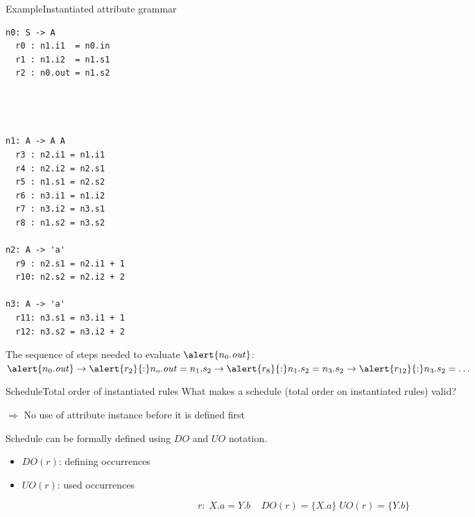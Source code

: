 \begin{frame}[fragile=singleslide]{Example}{Instantiated attribute grammar}


\begin{multicols}{3}
\begin{Verbatim}[fontsize=\scriptsize]
n0: S -> A
  r0 : n1.i1  = n0.in
  r1 : n1.i2  = n1.s1
  r2 : n0.out = n1.s2




n1: A -> A A
  r3 : n2.i1 = n1.i1
  r4 : n2.i2 = n2.s1
  r5 : n1.s1 = n2.s2
  r6 : n3.i1 = n1.i2
  r7 : n3.i2 = n3.s1
  r8 : n1.s2 = n3.s2

n2: A -> 'a'
  r9 : n2.s1 = n2.i1 + 1
  r10: n2.s2 = n2.i2 + 2
    
n3: A -> 'a'
  r11: n3.s1 = n3.i1 + 1
  r12: n3.s2 = n3.i2 + 2
\end{Verbatim}
\end{multicols}

The sequence of steps needed to evaluate $\alert{n_0.\mathit{out}}$:
$\alert{n_0.\mathit{out}} \to \alert{r_2}{:} n_o.\mathit{out} = n_1.s_2 \to \alert{r_8}{:} n_1.s_2 = n_3.s_2 \to \alert{r_{12}}{:}n_3.s_2 = \dots$

\end{frame}


\begin{frame}{Schedule}{Total order of instantiated rules}
What makes a schedule (total order on instantiated rules) valid?

\newlinevspace

$\Rightarrow$ \alert{No use of attribute instance before it is defined first}
\newlinevspace

Schedule can be formally defined using $\mathit{DO}$ and $\mathit{UO}$ notation.

\begin{itemize}
    \item \alert{$\mathit{DO}(r)$}: defining occurrences
    \item \alert{$\mathit{UO}(r)$}: used occurrences
\end{itemize}

\[r{:}\; X.a = Y.b\;\;\;\; \mathit{DO}(r) = \{X.a\}\;\mathit{UO}(r) = \{Y.b\}\]

\end{frame}

